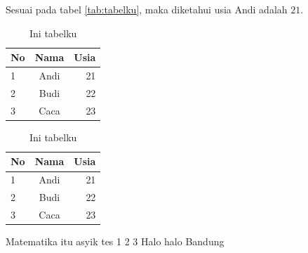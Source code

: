 \documentclass{article}
\begin{document}
    Sesuai pada tabel \ref{tab:tabelku}, maka diketahui usia Andi adalah $21$.

    \begin{table}[h!]
        \centering
        \begin{tabular}{|l|c|r|} 
            \toprule
            \textbf{No} & \textbf{Nama} & \textbf{Usia} \\
            \midrule
            1 & Andi & 21\\
            2 & Budi & 22\\
            3 & Caca & 23\\
            \bottomrule
        \end{tabular}
        \caption{Ini tabelku}
        \label{tab:tabeldua}
    \end{table}

    \begin{table}
        \centering
        \begin{tabular}{|l|c|r|} 
            \toprule
            \textbf{No} & \textbf{Nama} & \textbf{Usia} \\
            \midrule
            1 & Andi & 21\\
            2 & Budi & 22\\
            3 & Caca & 23\\
            \bottomrule
        \end{tabular}
        \caption{Ini tabelku}
        \label{tab:tabel3}
    \end{table}

    \newpage

    Matematika itu asyik \cite{ARTICLE:1} tes 1 2 3 \cite{BOOK:1} Halo halo Bandung \cite{BOOK:2}

    
    
\end{document}
